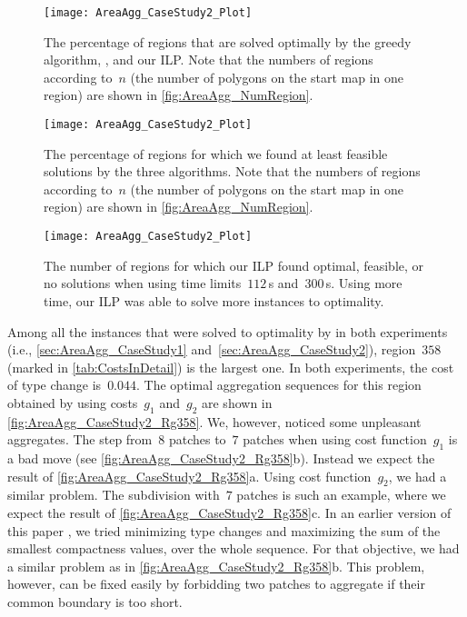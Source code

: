 \begin{figure}[tb]
\centering
\texttt{[image: AreaAgg\_CaseStudy2\_Plot]}
\caption{The percentage of regions that are solved 
	optimally by the greedy algorithm, \Astar, and our ILP.
	Note that the numbers of regions according to~$n$ 
	(the number of polygons on the start map in one region) 
	are shown in \fig\ref{fig:AreaAgg_NumRegion}.}
\label{fig:AreaAgg_CaseStudy2_Percentage_Optimal}
%
\par\vspace{\baselineskip} %
%
\centering
\texttt{[image: AreaAgg\_CaseStudy2\_Plot]}
\caption{The percentage of regions for which we found at 
	least feasible solutions by the three algorithms.
	Note that the numbers of regions according to~$n$ 
	(the number of polygons on the start map in one region) 
	are shown in \fig\ref{fig:AreaAgg_NumRegion}.}
\label{fig:AreaAgg_CaseStudy2_Percentage_Feasible}
\end{figure}

\begin{figure}[tb]
\centering
\texttt{[image: AreaAgg\_CaseStudy2\_Plot]}
\caption{The number of regions for which
	our ILP found optimal, feasible, or no solutions 
	when using time limits~$112\,$s and~$300\,$s.
	Using more time, our ILP was able to 
	solve more instances to optimality.}
\label{fig:AreaAgg_CaseStudy2_ILP}
\end{figure}

Among all the instances that were solved to optimality by \Astar
in both experiments (i.e., \sects\ref{sec:AreaAgg_CaseStudy1} 
and~\ref{sec:AreaAgg_CaseStudy2}),
region~$358$
(marked in \tab\ref{tab:CostsInDetail})
is the largest one.
In both experiments, the cost of type change is~$0.044$.
The optimal aggregation sequences for this region
obtained by using costs~$g_1$ and~$g_2$
are shown in \fig\ref{fig:AreaAgg_CaseStudy2_Rg358}.
We, however, noticed some unpleasant aggregates.
The step from~$8$ patches to~$7$ patches 
when using cost function~$g_1$ is a bad move
(see \fig\ref{fig:AreaAgg_CaseStudy2_Rg358}b).
Instead we expect the result of 
\fig\ref{fig:AreaAgg_CaseStudy2_Rg358}a.
Using cost function~$g_2$, we had a similar problem. 
The subdivision with~$7$ patches is such an example,
where we expect the result of 
\fig\ref{fig:AreaAgg_CaseStudy2_Rg358}c.
In an earlier version of this paper \parencite{Peng2017AStar},
we tried minimizing type changes 
and maximizing the sum of the smallest compactness values, 
over the whole sequence.
For that objective, we had a similar problem as 
in \fig\ref{fig:AreaAgg_CaseStudy2_Rg358}b.
This problem, however, can be fixed easily 
by forbidding two patches to aggregate 
if their common boundary is too short.



